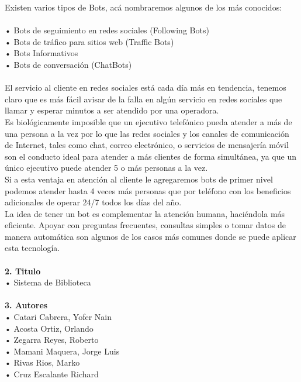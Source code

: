\begin{flushleft}
\begin{itemize}
Existen varios tipos de Bots, acá nombraremos algunos de los más conocidos: \textbf{ }\\
\textbf{ }\\
•	Bots de seguimiento en redes sociales (Following Bots)\textbf{ }\\
•	Bots de tráfico para sitios web (Traffic Bots)\textbf{ }\\
•	Bots Informativos\textbf{ }\\
•	Bots de conversación (ChatBots)\textbf{ }\\
\textbf{ }\\
El servicio al cliente en redes sociales está cada día más en tendencia, tenemos claro que es más fácil avisar de la falla en algún servicio en redes sociales que llamar y esperar minutos a ser atendido por una operadora.\textbf{ }\\
Es biológicamente imposible que un ejecutivo telefónico pueda atender a más de una persona a la vez por lo que las redes sociales y los canales de comunicación de Internet, tales como chat, correo electrónico, o servicios de mensajería móvil son el conducto ideal para atender a más clientes de forma simultánea, ya que un único ejecutivo puede atender 5 o más personas a la vez.\textbf{ }\\
Si a esta ventaja en atención al cliente le agregaremos bots de primer nivel podemos atender hasta 4 veces más personas que por teléfono con los beneficios adicionales de operar 24/7 todos los días del año.\textbf{ }\\
La idea de tener un bot es complementar la atención humana, haciéndola más eficiente. Apoyar con preguntas frecuentes, consultas simples o tomar datos de manera automática son algunos de los casos más comunes donde se puede aplicar esta tecnología.\textbf{ }\\
\textbf{ }\\
\textbf{2.	Titulo}\\
•         Sistema de Biblioteca
\textbf{ }\\
\textbf{ }\\
\textbf{3.	Autores}\\
•	Catari Cabrera, Yofer Nain\textbf{ }\\
•	Acosta Ortiz, Orlando \textbf{ }\\
•	Zegarra Reyes, Roberto\textbf{ }\\
•	Mamani Maquera, Jorge Luis\textbf{ }\\
•	Rivas Rios, Marko\textbf{ }\\
•	Cruz Escalante Richard\textbf{ }\\


\end{itemize}
\end{flushleft}
